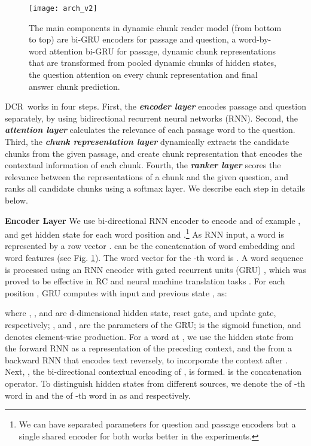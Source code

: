 \documentclass[letterpaper]{article}
\newcommand{\dcr}{DCR}
\begin{document}
\begin{figure}
\begin{center}
\texttt{[image: arch\_v2]}
\caption{{The main components in dynamic chunk reader model (from bottom to top) are bi-GRU encoders for passage and question, a word-by-word attention bi-GRU for passage, dynamic chunk representations that are transformed from pooled dynamic chunks of hidden states, the question attention on every chunk representation and final answer chunk prediction.}}
\label{fig_arch}
\vspace{-0.2in}
\end{center}
\end{figure}

\dcr\ works in four steps.
First, the \textit{\textbf{encoder layer}} encodes passage and question separately, by using bidirectional recurrent neural networks (RNN).
Second, the \textit{\textbf{attention layer}} calculates the relevance of each passage word to the question.
Third, the \textit{\textbf{chunk representation layer}} dynamically extracts the candidate chunks from the given passage, and create chunk representation that encodes the contextual information of each chunk.
Fourth, the \textit{\textbf{ranker layer}} scores the relevance between the representations of a chunk and the given question, and ranks all candidate chunks using a softmax layer.  
We describe each step in details below.


\noindent\textbf{Encoder Layer}
We use bi-directional RNN encoder to encode  and  of example , and get hidden state for each word position  and .\footnote{We can have separated parameters for question and passage encoders but a single shared encoder for both works better in the experiments.}
As RNN input, a word is represented by a row vector .  can be the concatenation of word embedding and word features (see Fig. \ref{fig_arch}). The word vector for the -th word is . A word sequence is processed using an RNN encoder with gated recurrent units (GRU) \cite{bengio2015deep}, which was proved to be effective in RC and neural machine translation tasks \cite{bahdanau2014neural,kadlec2016text,dhingra2016gated}. For each position , GRU computes  with input  and previous state , as:

where , , and  are d-dimensional hidden state, reset gate, and update gate, respectively; ,  and ,  are the parameters of the GRU;  is the sigmoid function, and  denotes element-wise production. For a word at , we use the hidden state  from the forward RNN as a representation of the preceding context, and the  from a backward RNN that encodes text reversely, to incorporate the context after . Next, , the bi-directional contextual encoding of , is formed.  is the concatenation operator. To distinguish hidden states from different sources, we denote the  of -th word in  and the  of -th word in  as  and  respectively.
\end{document}
